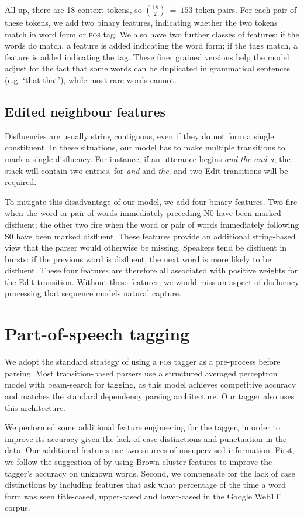 \documentclass[11pt,letterpaper]{article}
\newcommand{\pos}{\textsc{pos}\xspace}
\begin{document}
All up, there are 18 context tokens, so ${18 \choose 2}~=~153$ token pairs.
For each pair of these tokens, we add two binary features, indicating whether the
two tokens match in word form or \pos tag.  We also have two further classes of
features: if the words do match, a feature is added indicating the word form;
if the tags match, a feature is added indicating the tag. These finer grained
versions help the model adjust for the fact that some words can be duplicated
in grammatical sentences (e.g. `that that'), while most rare words cannot.

\subsection{Edited neighbour features}

Disfluencies are usually
string contiguous, even if they do not form a single constituent.
In these situations, our model has to make multiple transitions to mark a single
disfluency. For instance, if an utterance begins \emph{and the and a}, the stack
will contain two entries, for \emph{and} and \emph{the}, and two Edit transitions
will be required.

To mitigate this disadvantage of our model, we add four binary features. Two fire
when the word or pair of words immediately preceding N0 have been marked disfluent;
the other two fire when the word or pair of words immediately following S0
have been marked disfluent. These features provide an additional string-based
view that the parser would otherwise be missing.  Speakers tend be disfluent
in bursts: if the previous word is disfluent, the next word is more likely
to be disfluent.  These four features are therefore all associated with
positive weights for the Edit transition.  Without these features, we would
miss an aspect of disfluency processing that sequence models natural capture.


\section{Part-of-speech tagging}

We adopt the standard strategy of using a \pos tagger as a pre-process
before parsing.  Most transition-based
parsers use a structured averaged perceptron model with beam-search for tagging,
as this model achieves competitive accuracy and matches the standard dependency
parsing architecture. Our tagger also uses this architecture.

We performed some additional feature engineering for the tagger, in order to
improve its accuracy given the lack of case distinctions and punctuation in
the data. Our additional features use two sources of unsupervised information.
First, we follow the suggestion of \citet{manning:11} by using Brown cluster
features to improve the tagger's accuracy on unknown words. Second, we compensate
for the lack of case distinctions by including features that ask what percentage
of the time a word form was seen title-cased, upper-cased and lower-cased in the
Google Web1T corpus. 
\end{document}
